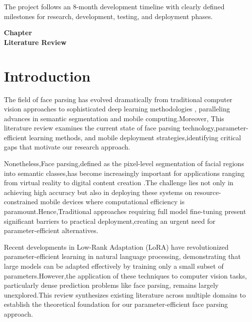 \documentclass[12pt,a4paper]{report}
\begin{document}
The project follows an 8-month development timeline with clearly defined milestones for research, development, testing, and deployment phases.
\newpage
\clearpage
\thispagestyle{empty}  %
\vspace*{\fill}
\begin{center}
{\Huge\bfseries Chapter \thechapter}\\[30pt]
{\Huge\bfseries Literature Review}
\end{center}
\vspace*{\fill}
\label{ch:literature_review}
\clearpage
\newpage
\section{Introduction}

The field of face parsing has evolved dramatically from traditional computer vision approaches to sophisticated deep learning methodologies , paralleling advances in semantic segmentation and mobile computing.Moreover, This literature review examines the current state of face parsing technology,parameter-efficient learning methods, and mobile deployment strategies,identifying critical gaps that motivate our research approach.

Nonetheless,Face parsing,defined as the pixel-level segmentation of facial regions into semantic classes,has become increasingly important for applications ranging from virtual reality to digital content creation               \cite{liu2015deep}.The challenge lies not only in achieving high accuracy but also in deploying these systems on resource-constrained mobile devices where computational efficiency is paramount.Hence,Traditional approaches requiring full model fine-tuning present significant barriers to practical deployment,creating an urgent need for parameter-efficient alternatives.

Recent developments in Low-Rank Adaptation (LoRA) \cite{hu2021lora} have revolutionized parameter-efficient learning in natural language processing, demonstrating that large models can be adapted effectively by training only a small subset of parameters.However,the application of these techniques to computer vision tasks, particularly dense prediction problems like face parsing, remains largely unexplored.This review synthesizes existing literature across multiple domains to establish the theoretical foundation for our parameter-efficient face parsing approach.
\end{document}
